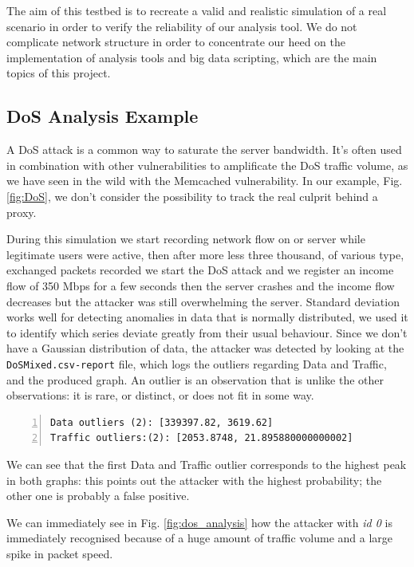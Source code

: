 The aim of this testbed is to recreate a valid and realistic simulation of a real scenario in order to verify the reliability of our analysis tool. 
We do not complicate network structure in order to concentrate our heed on the implementation of analysis tools and big data scripting, which are the main topics of this project.
  
\subsection{DoS Analysis Example}
A DoS attack is a common way to saturate the server bandwidth. It's often used in combination with other vulnerabilities to amplificate the DoS traffic volume, as we have seen in the wild with the Memcached vulnerability\cite{memcached_vulnerability}. 
In our example, Fig. \ref{fig:DoS}, we don't consider the possibility to track the real culprit behind a proxy.

During this simulation we start recording network flow on or server while legitimate users were active, then after more less three thousand, of various type, exchanged packets recorded we start the DoS attack and we register an income flow of 350 Mbps for a few seconds then the server crashes and the income flow decreases but the attacker was still overwhelming the server.
Standard deviation works well for detecting anomalies in data that is normally distributed, we used it to identify which series deviate greatly from their usual behaviour.
Since we don't have a Gaussian distribution of data, the attacker was detected by looking at the \texttt{DoSMixed.csv-report} file, which logs the outliers regarding Data and Traffic, and the produced graph. An outlier is an observation that is unlike the other observations: it is rare, or distinct, or does not fit in some way\cite{outliers}.

\begin{lstlisting}[numbers=left, columns=flexible, breaklines=false, frame=tb, caption={\textit{DoSMixed.csv-report} file}, label={lst:DoSMixed.csv-report}]
Data outliers (2): [339397.82, 3619.62]
Traffic outliers:(2): [2053.8748, 21.895880000000002]
\end{lstlisting}

We can see that the first Data and Traffic outlier corresponds to the highest peak in both graphs: this points out the attacker with the highest probability; the other one is probably a false positive.

We can immediately see in Fig. \ref{fig:dos_analysis} how the attacker with \textit{id 0} is immediately recognised because of a huge amount of traffic volume and a large spike in packet speed. 

